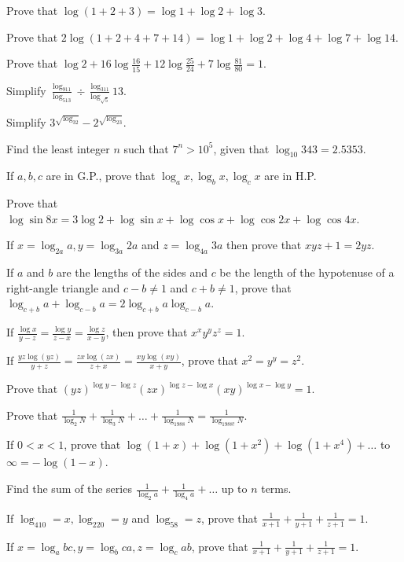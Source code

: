\item Prove that $\log(1 + 2 + 3) = \log 1 + \log 2 + \log 3$.
\item Prove that $2\log(1 + 2 + 4 + 7 + 14) = \log 1 + \log 2 + \log 4 + \log 7 + \log 14$.
\item Prove that $\log 2 + 16\log\frac{16}{15} + 12\log\frac{25}{24} + 7\log\frac{81}{80} = 1$.
\item Simplify $\frac{\log_911}{\log_513}\div\frac{\log_311}{\log_{\sqrt{5}}}13$.
\item Simplify $3^{\sqrt{\log_32}} - 2^{\sqrt{\log_23}}$.
\item Find the least integer $n$ such that $7^n > 10^5$, given that $\log_{10}343 = 2.5353$.
\item If $a, b, c$ are in G.P., prove that $\log_ax, \log_bx, \log_cx$ are in H.P.
\item Prove that $\log\sin8x = 3\log2 + \log\sin x + \log\cos x + \log\cos2x + \log\cos4x$.
\item If $x = \log_{2a}a, y = \log_{3a}2a$ and $z = \log_{4a}3a$ then prove that $xyz + 1 = 2yz$.
\item If $a$ and $b$ are the lengths of the sides and $c$ be the length of the hypotenuse of a right-angle triangle and $c - b \neq
  1$ and $c + b\neq 1$, prove that $\log_{c + b}a + \log_{c - b}a = 2\log_{c + b}a\log_{c - b}a$.
\item If $\frac{\log x}{y - z} = \frac{\log y}{z - x} = \frac{\log z}{x - y}$, then prove that $x^xy^yz^z = 1$.
\item If $\frac{yz\log(yz)}{y + z} = \frac{zx\log(zx)}{z + x} = \frac{xy\log(xy)}{x + y}$, prove that $x^2 = y^y = z^2$.
\item Prove that $(yz)^{\log y - \log z}(zx)^{\log z - \log x}(xy)^{\log x - \log y} = 1$.
\item Prove that $\frac{1}{\log_2N} + \frac{1}{\log_3N} + \ldots + \frac{1}{\log_{1988}N} = \frac{1}{\log_{1988!}N}$.
\item If $0<x<1$, prove that $\log(1 + x) + \log(1 + x^2) + \log(1 + x^4) + \ldots$ to $\infty = -\log(1 - x)$.
\item Find the sum of the series $\frac{1}{\log_2a} + \frac{1}{\log_4a} + \ldots$ up to $n$ terms.
\item If $\log_410 = x, \log_220 = y$ and $\log_58 = z$, prove that $\frac{1}{x + 1} + \frac{1}{y + 1} + \frac{1}{z + 1} = 1$.
\item If $x = \log_abc, y = \log_bca, z = \log_cab$, prove that $\frac{1}{x + 1} + \frac{1}{y + 1} + \frac{1}{z + 1} = 1$.

